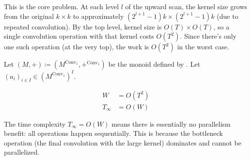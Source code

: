 \begin{ThomasAnnotation}
This is the core problem. At each level $l$ of the upward scan, the kernel size grows from the original $k \times k$ to approximately $(2^{l+1} - 1) k \times (2^{l+1} - 1) k$ (due to repeated convolution). By the top level, kernel size is $O(T) \times O(T)$, so a single convolution operation with that kernel costs $O(T^2)$. Since there's only one such operation (at the very top), the work is $O(T^2)$ in the worst case.
\end{ThomasAnnotation}

\begin{proposition}
    Let $(M, +) \coloneqq (M^{\mathrm{Conv}_1}, +^{\mathrm{Conv}_1})$ be the monoid defined by . Let $(a_i)_{i\in I}\in (M^{\mathrm{Conv}_1})^I$.

\begin{align}
    W&= O(T^2)\\
    T_\infty&= O(W)
\end{align}
\end{proposition}

\begin{ThomasAnnotation}
The time complexity $T_\infty = O(W)$ means there is essentially no parallelism benefit: all operations happen sequentially. This is because the bottleneck operation (the final convolution with the large kernel) dominates and cannot be parallelized.
\end{ThomasAnnotation}

